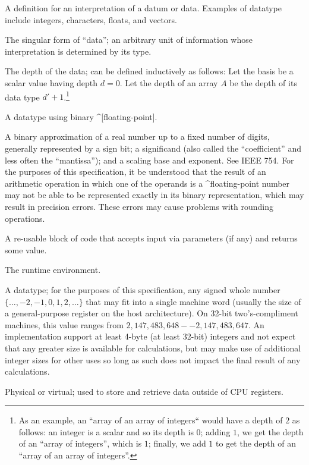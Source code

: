 \begin{description}
  A definition for an interpretation of a datum or data. Examples of datatype
  include integers, characters, floats, and vectors.

  The singular form of ``data''; an arbitrary unit of information whose
  interpretation is determined by its type.

  The depth of the data; can be defined inductively as follows: Let the basis be
  a scalar value having depth $d=0$. Let the depth of an array $A$ be the depth
  of its data type $d'+1$.\footnote{As an example, an ``array of an array of
  integers`` would have a depth of $2$ as follows: an integer is a scalar and so
  its depth is $0$; adding $1$, we get the depth of an ``array of integers'',
  which is $1$; finally, we add $1$ to get the depth of an ``array of an array
  of integers''.}

  A datatype using binary ^[floating-point].

  A binary approximation of a real number up to a fixed number of digits,
  generally represented by a sign bit; a significand (also called the
  ``coefficient'' and less often the ``mantissa''); and a scaling base and
  exponent. See IEEE 754. For the purposes of this specification, it \shall be
  understood that the result of an arithmetic operation in which one of the
  operands is a ^floating-point number may not be able to be represented exactly
  in its binary representation, which may result in precision errors. These
  errors may cause problems with rounding operations.

  A re-usable block of code that accepts input via parameters (if any) and
  returns some value.

  The runtime environment.

  A datatype; for the purposes of this specification, any signed whole number
  $\{\ldots, -2, -1, 0, 1, 2, \ldots\}$ that may fit into a single machine word
  (usually the size of a general-purpose register on the host architecture). On
  32-bit two's-compliment machines, this value ranges from
  $2,147,483,648--2,147,483,647$. An implementation \shall support at least
  4-byte (at least 32-bit) integers and \shall not expect that any greater size
  is available for calculations, but may make use of additional integer sizes
  for other uses so long as such does not impact the final result of any
  calculations.

  Physical or virtual; used to store and retrieve data outside of CPU registers.


\end{description}
